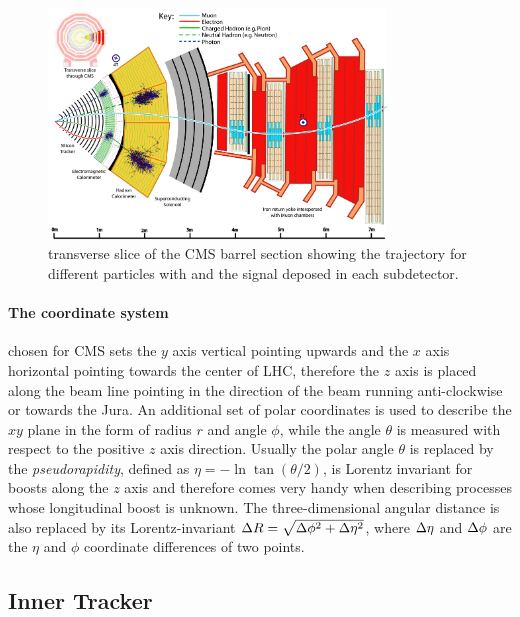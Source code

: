 \begin{figure}
\begin{center}
\includegraphics[angle=-0,width=0.8\textwidth]{2_LHC_and_CMS/pics/CMS_Slice_HD.png}
\caption{transverse slice of the CMS barrel section showing the trajectory for different particles with and the signal deposed in each subdetector.
\label{fig:cmsdet}
}
\end{center}
\end{figure}


\paragraph{The coordinate system}
chosen for CMS sets the $y$ axis vertical pointing upwards and the $x$ axis horizontal pointing towards the center of LHC, therefore the $z$ axis is placed along the beam line pointing in the direction of the beam running anti-clockwise or towards the Jura. An additional set of polar coordinates is used to describe the $xy$ plane in the form of radius $r$ and angle $\phi$, while the angle $\theta$ is measured with respect to the positive $z$ axis direction. Usually the polar angle $\theta$ is replaced by the \emph{pseudorapidity}, defined as $\eta=-\ln \tan(\theta/2)$, is Lorentz invariant for boosts along the $z$ axis and therefore comes very handy when describing processes whose longitudinal boost is unknown. The three-dimensional angular distance is also replaced by its Lorentz-invariant $\Delta R=\sqrt{\Delta\phi^2+\Delta\eta^2}$, where $\Delta\eta$ and $\Delta\phi$ are the $\eta$ and $\phi$ coordinate differences of two points.

\subsection{Inner Tracker}
\label{sec:inner_tracker}

